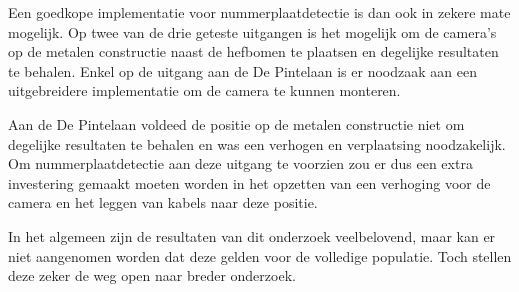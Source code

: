 Een goedkope implementatie voor nummerplaatdetectie is dan ook in zekere mate mogelijk. Op twee van de drie geteste uitgangen is het mogelijk om de camera's op de metalen constructie naast de hefbomen te plaatsen en degelijke resultaten te behalen. Enkel op de uitgang aan de De Pintelaan is er noodzaak aan een uitgebreidere implementatie om de camera te kunnen monteren.

Aan de De Pintelaan voldeed de positie op de metalen constructie niet om degelijke resultaten te behalen en was een verhogen en verplaatsing noodzakelijk. Om nummerplaatdetectie aan deze uitgang te voorzien zou er dus een extra investering gemaakt moeten worden in het opzetten van een verhoging voor de camera en het leggen van kabels naar deze positie.

In het algemeen zijn de resultaten van dit onderzoek veelbelovend, maar kan er niet aangenomen worden dat deze gelden voor de volledige populatie. Toch stellen deze zeker de weg open naar breder onderzoek.

